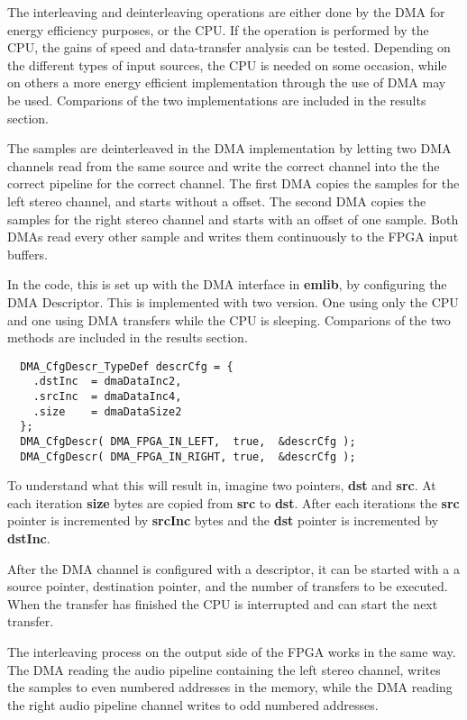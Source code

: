 The interleaving and deinterleaving operations are either done by the DMA for
energy efficiency purposes, or the CPU. If the operation is performed
by the CPU, the gains of speed and data-transfer analysis can be tested. Depending
on the different types of input sources, the CPU is needed on some occasion, while
on others a more energy efficient implementation through the use of DMA may be used.
Comparions of the two implementations are included in the results section.

The samples are deinterleaved in the DMA implementation by letting two DMA channels read from the
same source and write the correct channel into the the correct pipeline for the correct channel.
The first DMA copies the samples for the left stereo channel, and starts without a offset. The
second DMA copies the samples for the right stereo channel and starts with an
offset of one sample. Both DMAs read every other sample and writes them
continuously to the FPGA input buffers.

In the code, this is set up with the DMA interface in {\bf emlib}, by configuring the DMA Descriptor.
This is implemented with two version. One using only the CPU and one using DMA transfers
while the CPU is sleeping. Comparions of the two methods are included in the results section.

\begin{lstlisting}
  DMA_CfgDescr_TypeDef descrCfg = {
    .dstInc  = dmaDataInc2,
    .srcInc  = dmaDataInc4,
    .size    = dmaDataSize2
  };
  DMA_CfgDescr( DMA_FPGA_IN_LEFT,  true,  &descrCfg );
  DMA_CfgDescr( DMA_FPGA_IN_RIGHT, true,  &descrCfg );
\end{lstlisting}
To understand what this will result in, imagine two pointers, {\bf dst} and {\bf src}.
At each iteration {\bf size} bytes are copied from {\bf src} to {\bf dst}. After each
iterations the {\bf src} pointer is incremented by {\bf srcInc} bytes and the {\bf dst}
pointer is incremented by {\bf dstInc}.

After the DMA channel is configured with a descriptor, it can be started with a
a source pointer, destination pointer, and the number of transfers to be executed.
When the transfer has finished the CPU is interrupted and can start the next transfer.

The interleaving process on the output side of the FPGA works in the same way. The DMA reading
the audio pipeline containing the left stereo channel, writes the samples to even numbered
addresses in the memory, while the DMA reading the right audio pipeline channel writes
to odd numbered addresses.

